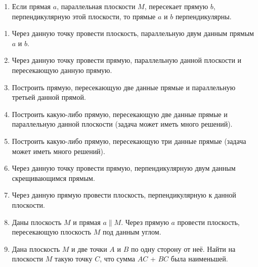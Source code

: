 {\begin{enumerate}[noitemsep]
\item
Если прямая $a$, параллельная плоскости $M$, пересекает прямую $b$, перпендикулярную этой плоскости, то прямые $a$ и $b$ перпендикулярны.
\end{enumerate}


\begin{enumerate}
\item
Через данную точку провести плоскость, параллельную двум данным прямым $a$ и $b$.

\item
Через данную точку провести прямую, параллельную данной плоскости и пересекающую данную прямую.

\item
Построить прямую, пересекающую две данные прямые и параллельную третьей данной прямой.

\item
Построить какую-либо прямую, пересекающую две данные прямые и параллельную данной плоскости (задача может иметь много решений).

\item
Построить какую-либо прямую, пересекающую три данные прямые (задача может иметь много решений).

\item
Через данную точку провести прямую, перпендикулярную двум данным скрещивающимся прямым.

\item
Через данную прямую провести плоскость, перпендикулярную к данной плоскости.

\item
Даны плоскость $M$ и прямая $a\parallel M$.
Через прямую $a$ провести плоскость, пересекающую плоскость $M$ под данным углом.

\item
Дана плоскость $M$ и две точки $A$ и $B$ по одну сторону от неё.
Найти на плоскости $M$ такую точку $C$, что сумма $AC$ + $BC$ была наименьшей.

\end{enumerate}


}

